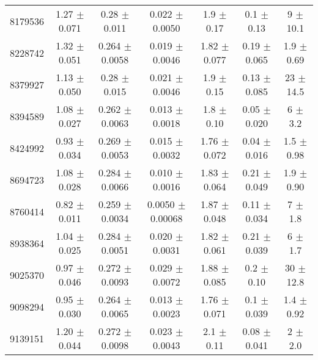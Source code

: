 \begin{table*}
\begin{tabular}{c|cccccc}
8179536  &        1.27   $\pm$  0.071    &        0.28   $\pm$  0.011    &        0.022  $\pm$  0.0050   &        1.9    $\pm$  0.17     &        0.1    $\pm$  0.13     &        9      $\pm$ 10.1      \\
8228742  &        1.32   $\pm$  0.051    &        0.264  $\pm$  0.0058   &        0.019  $\pm$  0.0046   &        1.82   $\pm$  0.077    &        0.19   $\pm$  0.065    &        1.9    $\pm$  0.69     \\
8379927  &        1.13   $\pm$  0.050    &        0.28   $\pm$  0.015    &        0.021  $\pm$  0.0046   &        1.9    $\pm$  0.15     &        0.13   $\pm$  0.085    &       23      $\pm$ 14.5      \\
8394589  &        1.08   $\pm$  0.027    &        0.262  $\pm$  0.0063   &        0.013  $\pm$  0.0018   &        1.8    $\pm$  0.10     &        0.05   $\pm$  0.020    &        6      $\pm$  3.2      \\
8424992  &        0.93   $\pm$  0.034    &        0.269  $\pm$  0.0053   &        0.015  $\pm$  0.0032   &        1.76   $\pm$  0.072    &        0.04   $\pm$  0.016    &        1.5    $\pm$  0.98     \\
8694723  &        1.08   $\pm$  0.028    &        0.284  $\pm$  0.0066   &        0.010  $\pm$  0.0016   &        1.83   $\pm$  0.064    &        0.21   $\pm$  0.049    &        1.9    $\pm$  0.90     \\
8760414  &        0.82   $\pm$  0.011    &        0.259  $\pm$  0.0034   &        0.0050 $\pm$  0.00068  &        1.87   $\pm$  0.048    &        0.11   $\pm$  0.034    &        7      $\pm$  1.8      \\
8938364  &        1.04   $\pm$  0.025    &        0.284  $\pm$  0.0051   &        0.020  $\pm$  0.0031   &        1.82   $\pm$  0.061    &        0.21   $\pm$  0.039    &        6      $\pm$  1.7      \\
9025370  &        0.97   $\pm$  0.046    &        0.272  $\pm$  0.0093   &        0.029  $\pm$  0.0072   &        1.88   $\pm$  0.085    &        0.2    $\pm$  0.10     &       30      $\pm$  12.8     \\
9098294  &        0.95   $\pm$  0.030    &        0.264  $\pm$  0.0065   &        0.013  $\pm$  0.0023   &        1.76   $\pm$  0.071    &        0.1    $\pm$  0.039    &        1.4    $\pm$  0.92     \\
9139151  &        1.20   $\pm$  0.044    &        0.272  $\pm$  0.0098   &        0.023  $\pm$  0.0043   &        2.1    $\pm$  0.11     &        0.08   $\pm$  0.041    &        2      $\pm$  2.0      \\

\end{tabular}
\end{table*}
